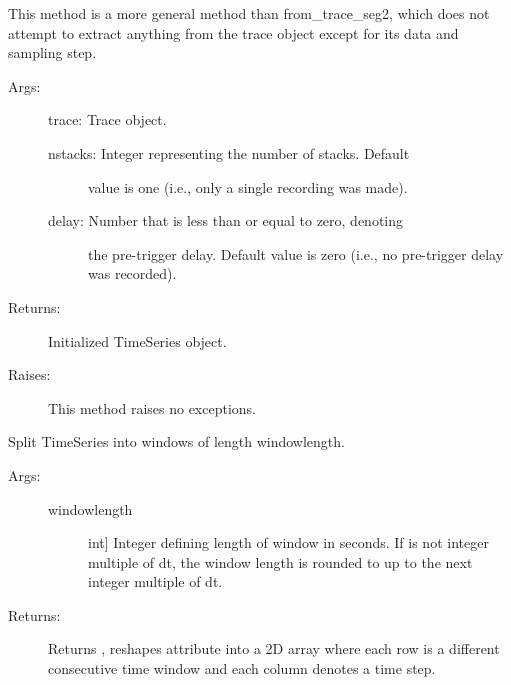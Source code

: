 \documentclass[letterpaper,10pt,english]{sphinxmanual}
\begin{document}
\begin{fulllineitems}
\begin{fulllineitems}
This method is a more general method than from\_trace\_seg2, which
does not attempt to extract anything from the trace object 
except for its data and sampling step.
\begin{description}
\item[{Args:}] \leavevmode
trace: Trace object.
\begin{description}
\item[{nstacks: Integer representing the number of stacks. Default }] \leavevmode
value is one (i.e., only a single recording was made).

\item[{delay: Number that is less than or equal to zero, denoting}] \leavevmode
the pre-trigger delay. Default value is zero (i.e., no
pre-trigger delay was recorded).

\end{description}

\item[{Returns:}] \leavevmode
Initialized TimeSeries object.

\item[{Raises:}] \leavevmode
This method raises no exceptions.

\end{description}

\end{fulllineitems}


\begin{fulllineitems}
\label{\detokenize{index:sigpropy.TimeSeries.split}}
Split TimeSeries into windows of length windowlength.
\begin{description}
\item[{Args:}] \leavevmode\begin{description}
\item[{windowlength}] \leavevmode{[}int{]}
Integer defining length of window in seconds. If 
 is not integer multiple of dt, the 
window length is rounded to up to the next integer
multiple of dt.

\end{description}

\item[{Returns:}] \leavevmode
Returns , reshapes attribute  into a 2D array 
where each row is a different consecutive time window and 
each column denotes a time step.


\end{description}
\end{fulllineitems}
\end{fulllineitems}
\end{document}
